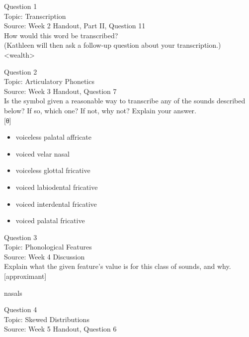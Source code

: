 \documentclass[12pt]{article}
\begin{document}
{\large Question 1}\\

Topic: Transcription\\
Source: Week 2 Handout, Part II, Question 11\\

How would this word be transcribed?\\ (Kathleen will then ask a follow-up question about your transcription.)\\

<wealth>


\newpage

{\large Question 2}\\

Topic: Articulatory Phonetics\\
Source: Week 3 Handout, Question 7\\

Is the symbol given a reasonable way to transcribe any of the sounds described below? If so, which one? If not, why not? Explain your answer.\\

{[θ]}

\begin{itemize} \item voiceless palatal affricate \item voiced velar nasal \item voiceless glottal fricative \item voiced labiodental fricative \item voiced interdental fricative \item voiced palatal fricative \end{itemize}


\newpage

{\large Question 3}\\

Topic: Phonological Features\\
Source: Week 4 Discussion\\

Explain what the given feature’s value is for this class of sounds, and why.\\

{[approximant]}

nasals


\newpage

{\large Question 4}\\

Topic: Skewed Distributions\\
Source: Week 5 Handout, Question 6\\
\end{document}
